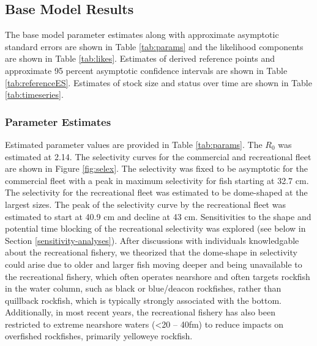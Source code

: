 \documentclass[11pt,
  english,
  a4paper,
]{article}
\begin{document}

\hypertarget{base-model-results}{%
\subsection{Base Model Results}\label{base-model-results}}

\leavevmode\tagmcend\tagstructend


The base model parameter estimates along with approximate asymptotic standard errors are shown in Table \ref{tab:params} and the likelihood components are shown in Table \ref{tab:likes}. Estimates of derived reference points and approximate 95 percent asymptotic confidence intervals are shown in Table \ref{tab:referenceES}. Estimates of stock size and status over time are shown in Table \ref{tab:timeseries}.

\leavevmode\tagmcend\tagstructend\par


\hypertarget{parameter-estimates}{%
\subsubsection{Parameter Estimates}\label{parameter-estimates}}

\leavevmode\tagmcend\tagstructend


Estimated parameter values are provided in Table \ref{tab:params}. The {\(R_0\)\leavevmode\tagmcend\tagstructend} was estimated at 2.14. The selectivity curves for the commercial and recreational fleet are shown in Figure \ref{fig:selex}. The selectivity was fixed to be asymptotic for the commercial fleet with a peak in maximum selectivity for fish starting at 32.7 cm. The selectivity for the recreational fleet was estimated to be dome-shaped at the largest sizes. The peak of the selectivity curve by the recreational fleet was estimated to start at 40.9 cm and decline at 43 cm. Sensitivities to the shape and potential time blocking of the recreational selectivity was explored (see below in Section \ref{sensitivity-analyses}). After discussions with individuals knowledgable about the recreational fishery, we theorized that the dome-shape in selectivity could arise due to older and larger fish moving deeper and being unavailable to the recreational fishery, which often operates nearshore and often targets rockfish in the water column, such as black or blue/deacon rockfishes, rather than quillback rockfish, which is typically strongly associated with the bottom. Additionally, in most recent years, the recreational fishery has also been restricted to extreme nearshore waters (\textless20 -- 40fm) to reduce impacts on overfished rockfishes, primarily yelloweye rockfish.
\end{document}
